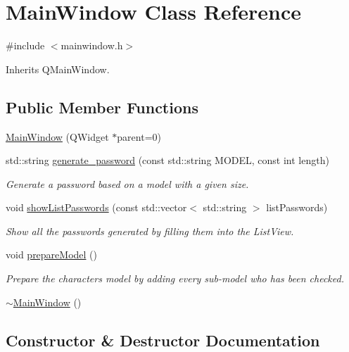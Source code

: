 \hypertarget{class_main_window}{}\section{Main\+Window Class Reference}
\label{class_main_window}


{\ttfamily \#include $<$mainwindow.\+h$>$}



Inherits Q\+Main\+Window.

\subsection*{Public Member Functions}
\begin{DoxyCompactItemize}
\item 
\hyperlink{class_main_window_a8b244be8b7b7db1b08de2a2acb9409db}{Main\+Window} (Q\+Widget $\ast$parent=0)
\item 
std\+::string \hyperlink{class_main_window_a6c529a8c6355646d45d12997a3842017}{generate\+\_\+password} (const std\+::string M\+O\+D\+EL, const int length)
\begin{DoxyCompactList}\small\item\em Generate a password based on a model with a given size. \end{DoxyCompactList}\item 
void \hyperlink{class_main_window_a17db0a9045fb37939d1f51a7b0ece556}{show\+List\+Passwords} (const std\+::vector$<$ std\+::string $>$ list\+Passwords)
\begin{DoxyCompactList}\small\item\em Show all the passwords generated by filling them into the List\+View. \end{DoxyCompactList}\item 
void \hyperlink{class_main_window_a80a094dd22dd7502c527f8c05e8f9093}{prepare\+Model} ()
\begin{DoxyCompactList}\small\item\em Prepare the characters model by adding every sub-\/model who has been checked. \end{DoxyCompactList}\item 
\hyperlink{class_main_window_ae98d00a93bc118200eeef9f9bba1dba7}{$\sim$\+Main\+Window} ()
\end{DoxyCompactItemize}


\subsection{Constructor \& Destructor Documentation}
